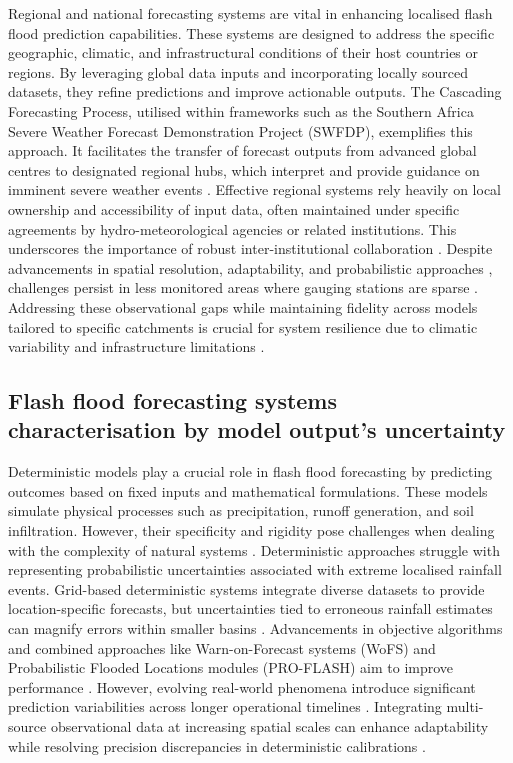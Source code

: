 Regional  and national forecasting systems are vital in enhancing localised flash flood prediction capabilities. These systems are designed to address the specific geographic, climatic, and infrastructural conditions of their host countries or regions. By leveraging global data inputs and incorporating locally sourced datasets, they refine predictions and improve actionable outputs. The Cascading Forecasting Process, utilised within frameworks such as the Southern Africa Severe Weather Forecast Demonstration Project (SWFDP), exemplifies this approach. It facilitates the transfer of forecast outputs from advanced global centres to designated regional hubs, which interpret and provide guidance on imminent severe weather events \citep{Jubach2016}. Effective regional systems rely heavily on local ownership and accessibility of input data, often maintained under specific agreements by hydro-meteorological agencies or related institutions. This underscores the importance of robust inter-institutional collaboration \citep{Georgakakos2022}. Despite advancements in spatial resolution, adaptability, and probabilistic approaches \citep{Zanchetta2020, AlRawas2024}, challenges persist in less monitored areas where gauging stations are sparse \citep{Kuksina2020}. Addressing these observational gaps while maintaining fidelity across models tailored to specific catchments is crucial for system resilience due to climatic variability and infrastructure limitations \citep{Liu2011, Douinot2016}. 



\subsection{Flash flood forecasting systems characterisation by model output's uncertainty}

Deterministic  models play a crucial role in flash flood forecasting by predicting outcomes based on fixed inputs and mathematical formulations. These models simulate physical processes such as precipitation, runoff generation, and soil infiltration. However, their specificity and rigidity pose challenges when dealing with the complexity of natural systems \citep{AlRawas2024, Liu2018}. Deterministic approaches struggle with representing probabilistic uncertainties associated with extreme localised rainfall events. Grid-based deterministic systems integrate diverse datasets to provide location-specific forecasts, but uncertainties tied to erroneous rainfall estimates can magnify errors within smaller basins \citep{Yatheendradas2008, Msigwa2024}. Advancements in objective algorithms and combined approaches like Warn-on-Forecast systems (WoFS) and Probabilistic Flooded Locations modules (PRO-FLASH) aim to improve performance \citep{AlRawas2024}. However, evolving real-world phenomena introduce significant prediction variabilities across longer operational timelines \citep{Pham2020, AlRawas2024}. Integrating multi-source observational data at increasing spatial scales can enhance adaptability while resolving precision discrepancies in deterministic calibrations \citep{Lu2021, Liu2018}. 


